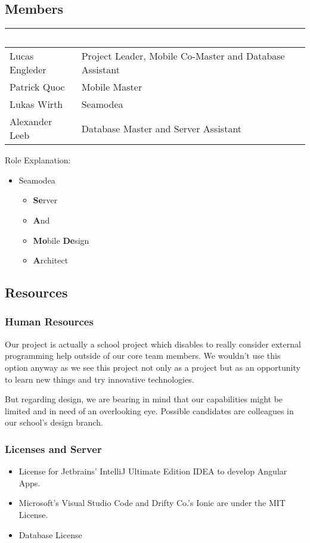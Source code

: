 \documentclass[12pt]{article}
\theoremstyle{definition}
\newenvironment{text}{
}{}
\begin{document}
\subsection{Members}
\begin{tabular}{|l|l|}
\hline
\cellcolor[gray]{0.5}\textcolor{white}{Name} & \cellcolor[gray]{0.5}\textcolor{white}{Role}\\ \hline
Lucas Engleder & Project Leader, Mobile Co-Master and Database Assistant\\ \hline
Patrick Quoc & Mobile Master\\ \hline
Lukas Wirth & Seamodea \\  \hline
Alexander Leeb & Database Master and Server Assistant \\ \hline
\end{tabular}

Role Explanation:
\begin{itemize}
    \item Seamodea
    \begin{itemize}
        \item \textbf{Se}rver
        \item \textbf{A}nd
        \item \textbf{Mo}bile \textbf{De}sign
        \item \textbf{A}rchitect
    \end{itemize} 
\end{itemize}
\subsection{Resources}
\subsubsection{Human Resources}
\begin{text}
Our project is actually a school project which disables to really consider external programming help outside of our core team members. We wouldn't use this option anyway as we see this project not only as a project but as an opportunity to learn new things and try innovative technologies.

But regarding design, we are bearing in mind that our capabilities might be limited and in need of an overlooking eye. Possible candidates are colleagues in our school's design branch.\end{text}

\subsubsection{Licenses and Server}
\begin{itemize}
\item License for Jetbrains' IntelliJ Ultimate Edition IDEA to develop Angular Apps.
\item Microsoft's Visual Studio Code and Drifty Co.'s Ionic are under the MIT License.
\item Database License
\end{itemize}
\end{document}

